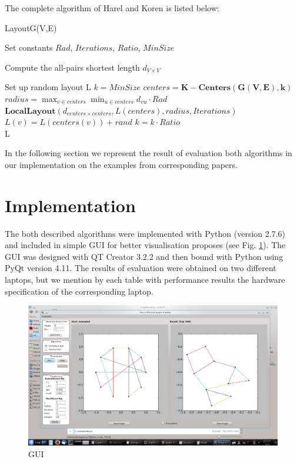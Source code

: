 \documentclass[12pt,a4paper]{article}
\begin{document}
\FloatBarrier 

The complete algorithm of Harel and Koren is listed below:

\begin{algorithm}
\caption{LayoutG(V,E) \cite{DavidHarel2002}}
\label{HK}
\begin{algorithmic}[1]
\item Set constants $Rad$, $Iterations$, $Ratio$, $MinSize$
\item Compute the all-pairs shortest length $d_{V\times V}$
\item Set up random layout L
\State $ k = MinSize $
	\State $ centers =  \mathbf{K-Centers(G(V,E),k)} $
	\State $ radius =  \max_{v\in centers}\min_{u\in centers}d_{vu} \cdot Rad $	
	\State $\mathbf{LocalLayout}(d_{centers\times centers}, L(centers), radius, Iterations)$
		\State $L(v)=L(centers(v))+rand$
	\EndFor
	\State $k = k \cdot Ratio$
\EndWhile \\
\Return L
\end{algorithmic}
\end{algorithm}

In the following section we represent the result of evaluation both algorithms in our implementation on the examples from corresponding papers.

\section{Implementation}
The both described algorithms were implemented with Python (version 2.7.6) and included in simple GUI for better visualisation proposes (see Fig. \ref{fig: 0}). The GUI was designed with QT Creator 3.2.2 and then bound with Python using PyQt version 4.11. The results of evaluation were obtained on two different laptops, but we mention by each table with performance results the hardware specification of the corresponding laptop.

\begin{figure}
	\centering
	\includegraphics[scale=0.2]{interface.png}
	\caption{GUI}\label{fig: 0}
\end{figure}
\end{document}
